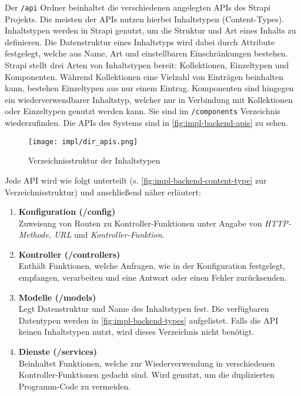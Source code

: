 Der \lstinline[style=code, style=inline]{/api} Ordner beinhaltet die
verschiedenen angelegten APIs des Strapi Projekts. Die meisten der APIs nutzen
hierbei Inhaltstypen (Content-Types). Inhaltstypen werden in Strapi genutzt, um
die Struktur und Art eines Inhalts zu definieren. Die Datenstruktur eines
Inhaltstyps wird dabei durch Attribute festgelegt, welche aus Name, Art und
einstellbaren Einschränkungen bestehen. Strapi stellt drei Arten von
Inhaltstypen bereit: Kollektionen, Einzeltypen und Komponenten. Während
Kollektionen eine Vielzahl von Einträgen beinhalten kann, bestehen Einzeltypen
aus nur einem Eintrag. Komponenten sind hingegen ein wiederverwendbarer
Inhaltstyp, welcher nur in Verbindung mit Kollektionen oder Einzeltypen genutzt
werden kann. Sie sind im \lstinline[style=code, style=inline]{/components}
Verzeichnis wiederzufinden. Die APIs des Systems sind in
\autoref{fig:impl-backend-apis} zu sehen.

\begin{figure}[htpb]
    \centering
    \texttt{[image: impl/dir\_apis.png]}
    \caption{Verzeichnisstruktur der Inhaltstypen}
    \label{fig:impl-backend-apis}
\end{figure}

Jede API wird wie folgt unterteilt (s. \autoref{fig:impl-backend-content-type}
zur Verzeichnisstruktur) und anschließend näher erläutert:

\begin{enumerate}
    \setlength{\itemsep}{1em}
    \item \textbf{Konfiguration (/config)} \\
          Zuweisung von Routen zu Kontroller-Funktionen unter Angabe von
          \textit{HTTP-Methode, URL} und \textit{Kontroller-Funktion}.
    \item \textbf{Kontroller (/controllers)} \\
          Enthält Funktionen, welche Anfragen, wie in der Konfiguration
          festgelegt, empfangen, verarbeiten und eine Antwort oder einen Fehler
          zurücksenden.
    \item \textbf{Modelle (/models)} \\
          Legt Datenstruktur und Name des Inhaltstypen fest. Die verfügbaren
          Datentypen werden in \autoref{fig:impl-backend-types} aufgelistet.
          Falls die API keinen Inhaltstypen nutzt, wird dieses Verzeichnis nicht
          benötigt.
    \item \textbf{Dienste (/services)} \\
          Beinhaltet Funktionen, welche zur Wiederverwendung in verschiedenen
          Kontroller-Funktionen gedacht sind. Wird genutzt, um die duplizierten
          Programm-Code zu vermeiden.
\end{enumerate}

